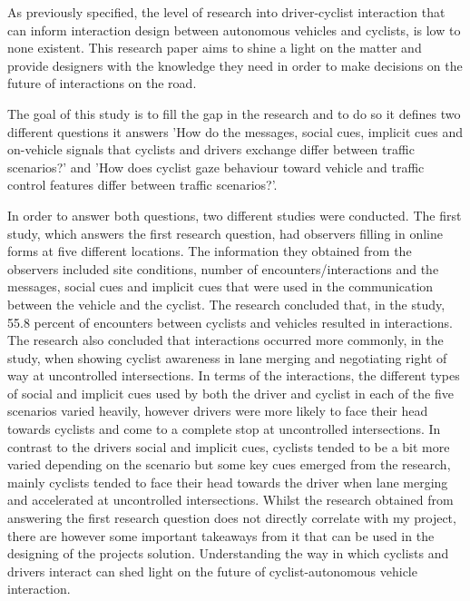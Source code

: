 \documentclass{l4proj}
\begin{document}
As previously specified, the level of research into driver-cyclist interaction that can inform interaction design between autonomous vehicles and cyclists, is low to none existent. This research paper aims to shine a light on the matter and provide designers with the knowledge they need in order to make decisions on the future of interactions on the road.

The goal of this study is to fill the gap in the research and to do so it defines two different questions it answers 'How do the messages, social cues, implicit cues and on-vehicle signals that cyclists and drivers exchange differ between traffic scenarios?' and 'How does cyclist gaze behaviour toward vehicle and traffic control features differ between traffic scenarios?'.

In order to answer both questions, two different studies were conducted. The first study, which answers the first research question, had observers filling in online forms at five different locations. The information they obtained from the observers included site conditions, number of encounters/interactions and the messages, social cues and implicit cues that were used in the communication between the vehicle and the cyclist. The research concluded that, in the study, 55.8 percent of encounters between cyclists and vehicles resulted in interactions. The research also concluded that interactions occurred more commonly, in the study, when showing cyclist awareness in lane merging and negotiating right of way at uncontrolled intersections. In terms of the interactions, the different types of social and implicit cues used by both the driver and cyclist in each of the five scenarios varied heavily, however drivers were more likely to face their head towards cyclists and come to a complete stop at uncontrolled intersections. In contrast to the drivers social and implicit cues, cyclists tended to be a bit more varied depending on the scenario but some key cues emerged from the research, mainly cyclists tended to face their head towards the driver when lane merging and accelerated at uncontrolled intersections. Whilst the research obtained from answering the first research question does not directly correlate with my project, there are however some important takeaways from it that can be used in the designing of the projects solution. Understanding the way in which cyclists and drivers interact can shed light on the future of cyclist-autonomous vehicle interaction.
\end{document}
